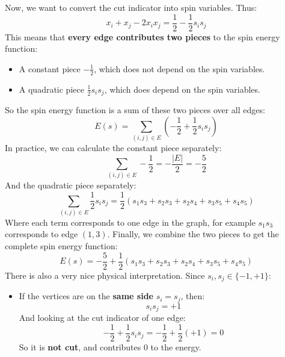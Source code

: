 \begin{deepeningbox}
    \highspace
    Now, we want to convert the cut indicator into spin variables. Thus:
    \begin{equation*}
        x_i + x_j - 2 x_i x_j
        =
        \frac{1}{2} - \frac{1}{2}s_is_j
    \end{equation*}
    This means that \textbf{every edge contributes two pieces} to the spin energy function:
    \begin{itemize}
        \item A constant piece $-\frac{1}{2}$, which does not depend on the spin variables.
        \item A quadratic piece $\frac{1}{2}s_is_j$, which does depend on the spin variables.
    \end{itemize}
    So the spin energy function is a sum of these two pieces over all edges:
    \begin{equation*}
        E(s) = \sum_{(i,j)\in E} \left(-\frac{1}{2} + \frac{1}{2}s_is_j\right)
    \end{equation*}
    In practice, we can calculate the constant piece separately:
    \begin{equation*}
        \sum_{(i,j)\in E} -\frac{1}{2} = -\frac{\left|E\right|}{2} = -\frac{5}{2}
    \end{equation*}
    And the quadratic piece separately:
    \begin{equation*}
        \sum_{(i,j)\in E} \frac{1}{2}s_is_j = \frac{1}{2}\left(s_1s_3 + s_2s_3 + s_2s_4 + s_3s_5 + s_4s_5\right)
    \end{equation*}
    Where each term corresponds to one edge in the graph, for example $s_1 s_3$ corresponds to edge $(1,3)$. Finally, we combine the two pieces to get the complete spin energy function:
    \begin{equation*}
        E(s) = -\frac{5}{2} + \frac{1}{2}\left(s_1s_3 + s_2s_3 + s_2s_4 + s_3s_5 + s_4s_5\right)
    \end{equation*}
    There is also a very nice physical interpretation. Since $s_i, s_j \in \{-1,+1\}$:
    \begin{itemize}
        \item If the vertices are on the \textbf{same side} $s_i = s_j$, then:
            \begin{equation*}
                s_i s_j = +1
            \end{equation*}
            And looking at the cut indicator of one edge:
            \begin{equation*}
                -\frac{1}{2} + \frac{1}{2}s_is_j = -\frac{1}{2} + \frac{1}{2}(+1) = 0
            \end{equation*}
            So it is \textbf{not cut}, and contributes $0$ to the energy.


\end{itemize}
\end{deepeningbox}
